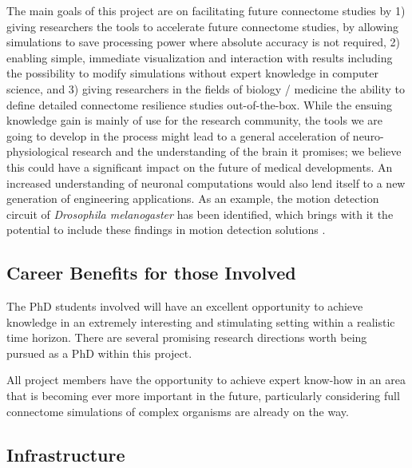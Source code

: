 \documentclass[a4paper,11pt]{article}
\begin{document}
The main goals of this project are on facilitating future connectome studies by 1) giving researchers the tools to accelerate future connectome studies, by allowing simulations to save processing power where absolute accuracy is not required, 2) enabling simple, immediate visualization and interaction with results including the possibility to modify simulations without expert knowledge in computer science, and 3) giving researchers in the fields of biology / medicine the ability to define detailed connectome resilience studies out-of-the-box. While the ensuing knowledge gain is mainly of use for the research community, the tools we are going to develop in the process might lead to a general acceleration of neuro-physiological research and the understanding of the brain it promises; we believe this could have a significant impact on the future of medical developments. An increased understanding of neuronal computations would also lend itself to a new generation of engineering applications. As an example, the motion detection circuit of \emph{Drosophila melanogaster} has been identified, which brings with it the potential to include these findings in motion detection solutions \citep{Takemura2013}.


\subsection{Career Benefits for those Involved}

The PhD students involved will have an excellent opportunity to achieve knowledge in an extremely interesting and stimulating setting within a realistic time horizon. There are several promising research directions worth being pursued as a PhD within this project. 

All project members have the opportunity to achieve expert know-how in an area that is becoming ever more important in the future, particularly considering full connectome simulations of complex organisms are already on the way.


\subsection{Infrastructure}
\end{document}
